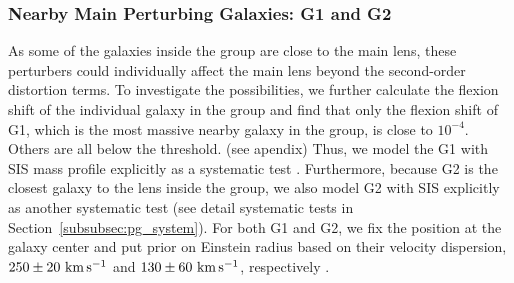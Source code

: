 \documentclass[useAMS,usenatbib]{mnras}
\newcommand{\sref}[1]{Section~\ref{#1}}
\def\kms {\rm km\,s^{-1}}
\begin{document}




\subsubsection{Nearby Main Perturbing Galaxies: G1 and G2}
\label{subsubsec:G1G2}
As some of the galaxies inside the group are close to the main lens, these perturbers could individually affect the main lens beyond the second-order distortion terms. To investigate the possibilities, we further calculate the flexion shift of the individual galaxy in the group and find that only the flexion shift of G1, which is the most massive nearby galaxy in the group, is close to $10^{-4}$. Others are all below the threshold. (see apendix)
Thus, we model the G1 with SIS mass profile explicitly as a systematic test . Furthermore, because G2 is the closest galaxy to the lens inside the group, we also model G2 with SIS explicitly as another systematic test (see detail systematic tests in \sref{subsubsec:pg_system}). For both G1 and G2, we fix the position at the galaxy center and put prior on Einstein radius based on their velocity dispersion, $250\pm20~\kms$ and $130\pm60~\kms$, respectively \citep[][]{Tonry98}.
\end{document}
